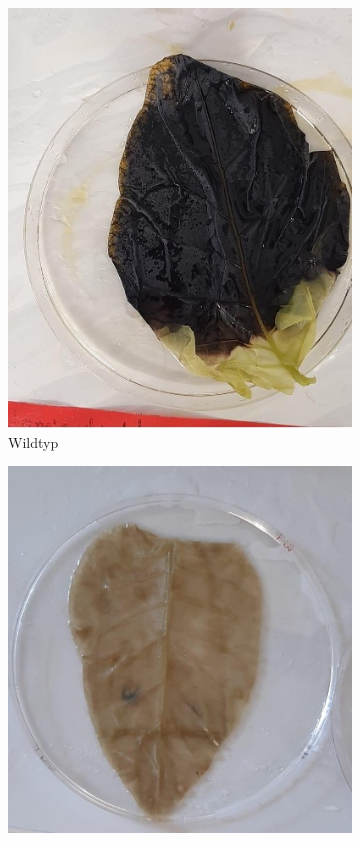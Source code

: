 \documentclass[10pt,a4paper]{article}
\begin{document}
				
		\begin{figure}[H]
			\centering
			\begin{subfigure}[b]{0.3\textwidth}
				\includegraphics[width=\textwidth]{wildtypblatt.jpg}
				\caption{Wildtyp}
				\label{fig:wildtyp färbung}
			\end{subfigure}
			\hfill
			\begin{subfigure}[b]{0.345\textwidth}
				\includegraphics[width=\textwidth]{antisenseblatt.jpg}

\end{subfigure}
\end{figure}
\end{document}
